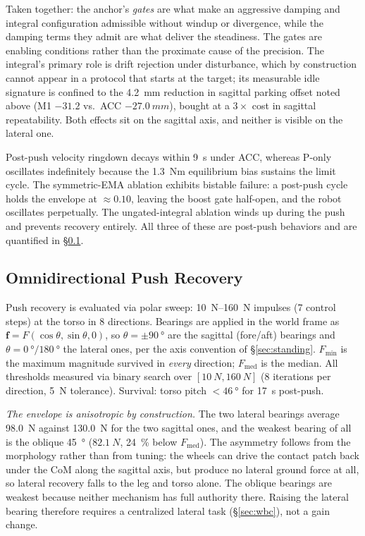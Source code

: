 \documentclass[conference]{IEEEtran}
\begin{document}
Taken together: the anchor's \emph{gates} are what make an aggressive damping and
integral configuration admissible without windup or divergence, while the damping
terms they admit are what deliver the steadiness. The gates are enabling
conditions rather than the proximate cause of the precision. The integral's primary role is drift rejection
under disturbance, which by construction cannot appear in a protocol that starts
at the target; its measurable idle signature is confined to the \SI{4.2}{mm}
reduction in sagittal parking offset noted above (M1 $-31.2$ vs.\ ACC
$\SI{-27.0}{mm}$), bought at a $3{\times}$ cost in sagittal repeatability. Both
effects sit on the sagittal axis, and neither is visible on the lateral one.

Post-push velocity ringdown decays within \SI{9}{s} under ACC, whereas P-only
oscillates indefinitely because the \SI{1.3}{Nm} equilibrium bias sustains the limit
cycle. The symmetric-EMA ablation exhibits bistable failure: a post-push cycle holds
the envelope at ${\approx}0.10$, leaving the boost gate half-open, and the robot
oscillates perpetually. The ungated-integral ablation winds up during the push and
prevents recovery entirely. All three of these are post-push behaviors and are
quantified in \S\ref{sec:push}.

\subsection{Omnidirectional Push Recovery}
\label{sec:push}

Push recovery is evaluated via polar sweep: \SIrange{10}{160}{N} impulses (\num{7} control steps) at the torso in \num{8} directions.
Bearings are applied in the world frame as $\mathbf{f}=F(\cos\theta,\sin\theta,0)$, so $\theta{=}\pm\SI{90}{\degree}$ are the sagittal (fore/aft) bearings and $\theta{=}\SI{0}{\degree}/\SI{180}{\degree}$ the lateral ones, per the axis convention of \S\ref{sec:standing}.
$F_{\min}$ is the maximum magnitude survived in \emph{every} direction; $F_{\text{med}}$ is the median.
All thresholds measured via binary search over $[\SI{10}{N},\SI{160}{N}]$ (\num{8} iterations per direction, \SI{5}{N} tolerance).
Survival: torso pitch $<\SI{46}{\degree}$ for \SI{17}{s} post-push.

\emph{The envelope is anisotropic by construction.} The two lateral bearings average \SI{98.0}{N} against \SI{130.0}{N} for the two sagittal ones, and the weakest bearing of all is the oblique \SI{45}{\degree} ($\SI{82.1}{N}$, \SI{24}{\percent} below $F_{\text{med}}$). The asymmetry follows from the morphology rather than from tuning: the wheels can drive the contact patch back under the CoM along the sagittal axis, but produce no lateral ground force at all, so lateral recovery falls to the leg and torso alone. The oblique bearings are weakest because neither mechanism has full authority there. Raising the lateral bearing therefore requires a centralized lateral task (\S\ref{sec:wbc}), not a gain change.
\end{document}
